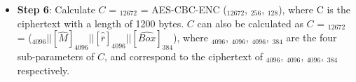 \documentclass[main\_\_EN.tex]{subfiles}
\begin{document}
\begin{itemize}
    \item {\bfseries Step 6}: Calculate \begin{math}C\end{math} = \begin{math}[C]_{12672}\end{math} =
            AES-CBC-ENC (\begin{math}[P]_{12672}\end{math}, \begin{math}[RSA\_DS\_KEY]_{256}\end{math}, \begin{math}[IV]_{128}\end{math}), where C is the ciphertext with a length of 1200 bytes.
            \begin{math}C\end{math} can also be calculated as
            \begin{math}C\end{math} = \begin{math}[C]_{12672}\end{math} =
            (\begin{math}
            [\widehat{Y}]_{4096} ||
            [\widehat{M}]_{4096} ||
            [\widehat{ \overline{r} }]_{4096} ||
            [\widehat{Box}]_{384}
            \end{math}),
            where
            \begin{math} [\widehat{Y}]_{4096} \end{math},
            \begin{math} [\widehat{M}]_{4096} \end{math},
            \begin{math} [\widehat{ \overline{r} }]_{4096} \end{math},
            \begin{math} [\widehat{Box}]_{384} \end{math}
            are the four sub-parameters of \begin{math}C\end{math}, and correspond to the ciphertext of
            \begin{math} [Y]_{4096} \end{math},
            \begin{math} [M]_{4096} \end{math},
            \begin{math} [\overline{r}]_{4096} \end{math},
            \begin{math} [Box]_{384} \end{math}
            respectively.

\end{itemize}
\end{document}
